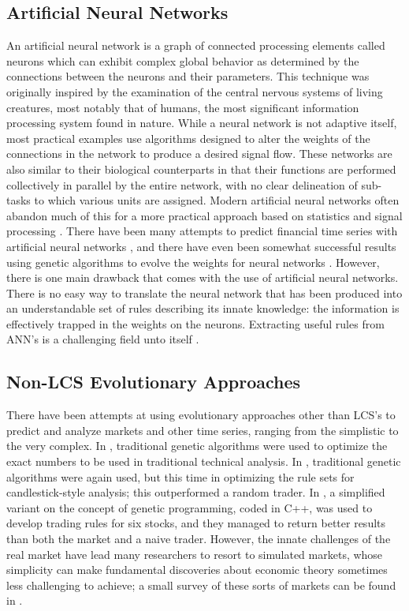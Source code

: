 \subsection{Artificial Neural Networks}
An artificial neural network is a graph of connected processing elements called neurons which can exhibit complex global behavior as determined by the connections between the neurons and their parameters.
This technique was originally inspired by the examination of the central nervous systems of living creatures, most notably that of humans, the most significant information processing system found in nature.
While a neural network is not adaptive itself, most practical examples use algorithms designed to alter the weights of the connections in the network to produce a desired signal flow.
These networks are also similar to their biological counterparts in that their functions are performed collectively in parallel by the entire network, with no clear delineation of sub-tasks to which various units are assigned.
Modern artificial neural networks often abandon much of this for a more practical approach based on statistics and signal processing \cite{HK:2000:ANN}.
There have been many attempts to predict financial time series with artificial neural networks
\cite{WuLu:1993:CSC93, KR:1994:NNAPL},
and there have even been somewhat successful results using genetic algorithms to evolve the weights for neural networks \cite{SC:2002:NNGA, KCM:2005:GECCO2005}.
However, there is one main drawback that comes with the use of artificial neural networks.
There is no easy way to translate the neural network that has been produced into an understandable set of rules describing its innate knowledge: the information is effectively trapped in the weights on the neurons.
Extracting useful rules from ANN's is a challenging field unto itself \cite{AndrewsGeva:2000}.

\subsection{Non-LCS Evolutionary Approaches}
There have been attempts at using evolutionary approaches other than LCS's to predict and analyze markets and other time series, ranging from the simplistic to the very complex.
In \cite{FGLG:2006:GECCO}, traditional genetic algorithms were used to optimize the exact numbers to be used in traditional technical analysis.
In \cite{Belford:2006:GECCO}, traditional genetic algorithms were again used, but this time in optimizing the rule sets for candlestick-style analysis; this outperformed a random trader.
In \cite{Kaboudan:2000:CompEcon}, a simplified variant on the concept of genetic programming, coded in C++, was used to develop trading rules for six stocks, and they managed to return better results than both the market and a naive trader.
However, the innate challenges of the real market have lead many researchers to resort to simulated markets, whose simplicity can make fundamental discoveries about economic theory sometimes less challenging to achieve; a small survey of these sorts of markets can be found in \cite{WHD:2002:AIReview}.

